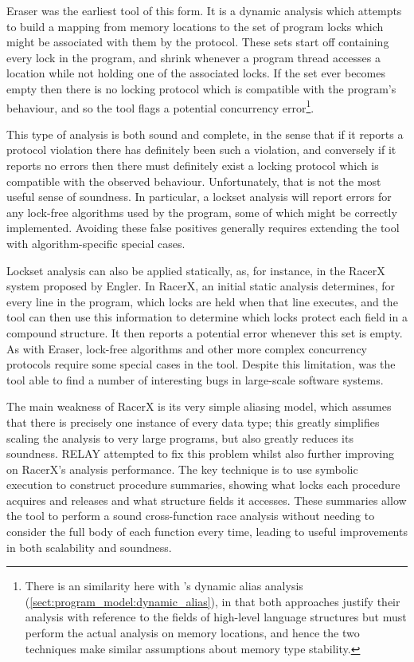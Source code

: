 Eraser\cite{Savage1997} was the earliest tool of this form.  It is a
dynamic analysis which attempts to build a mapping from memory
locations to the set of program locks which might be associated with
them by the protocol.  These sets start off containing every lock in
the program, and shrink whenever a program thread accesses a location
while not holding one of the associated locks.  If the set ever
becomes empty then there is no locking protocol which is compatible
with the program's behaviour, and so the tool flags a potential
concurrency error\footnote{There is an similarity here with
  {\technique}'s dynamic alias analysis
  (\autoref{sect:program_model:dynamic_alias}), in that both
  approaches justify their analysis with reference to the fields of
  high-level language structures but must perform the actual analysis
  on memory locations, and hence the two techniques make similar
  assumptions about memory type stability.}.

This type of analysis is both sound and complete, in the sense that if
it reports a protocol violation there has definitely been such a
violation, and conversely if it reports no errors then there must
definitely exist a locking protocol which is compatible with the
observed behaviour.  Unfortunately, that is not the most useful sense
of soundness.  In particular, a lockset analysis will report errors
for any lock-free algorithms used by the program, some of which might
be correctly implemented.  Avoiding these false positives generally
requires extending the tool with algorithm-specific special cases.

Lockset analysis can also be applied statically, as, for instance, in
the RacerX system proposed by Engler\cite{Engler2003}.  In RacerX, an
initial static analysis determines, for every line in the program,
which locks are held when that line executes, and the tool can then
use this information to determine which locks protect each field in a
compound structure.  It then reports a potential error whenever this
set is empty.  As with Eraser, lock-free algorithms and other more
complex concurrency protocols require some special cases in the tool.
Despite this limitation, was the tool able to find a number of
interesting bugs in large-scale software systems.

The main weakness of RacerX is its very simple aliasing model, which
assumes that there is precisely one instance of every data type; this
greatly simplifies scaling the analysis to very large programs, but
also greatly reduces its soundness.  RELAY\cite{Voung2007} attempted
to fix this problem whilst also further improving on RacerX's analysis
performance.  The key technique is to use symbolic execution to
construct procedure summaries\cite{Qadeer2004}, showing what locks
each procedure acquires and releases and what structure fields it
accesses.  These summaries allow the tool to perform a sound
cross-function race analysis without needing to consider the full body
of each function every time, leading to useful improvements in both
scalability and soundness.

